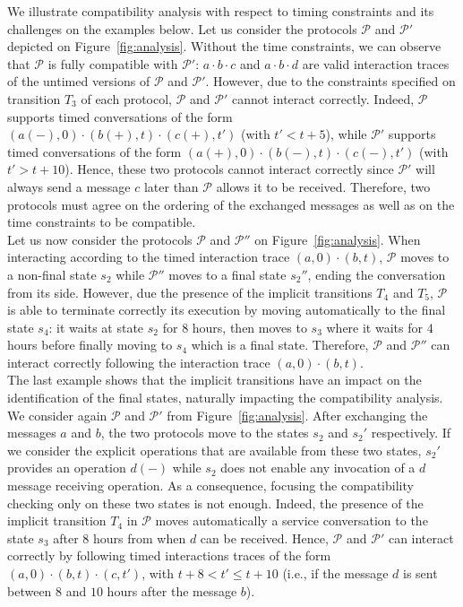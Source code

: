 We illustrate compatibility analysis with respect to timing constraints and its challenges on the examples below.
Let us consider the protocols $\mathcal{P}$ and $\mathcal{P'}$ depicted on Figure~\ref{fig:analysis}. Without the time constraints, we can observe that $\mathcal{P}$ is fully compatible with $\mathcal{P'}$: $a \cdot b \cdot c$ and
$a \cdot b \cdot d$ are valid interaction traces of the untimed versions of $\mathcal{P}$ and $\mathcal{P'}$. However, due to the \CInvoke constraints specified on transition $T_3$ of each protocol, $\mathcal{P}$ and $\mathcal{P'}$ cannot interact correctly. Indeed, $\mathcal{P}$ supports timed conversations of the form $(a(-), 0) \cdot (b(+), t) \cdot (c(+), t')$ (with $t' < t + 5$), while $\mathcal{P'}$ supports timed conversations of the form $(a(+), 0) \cdot (b(-), t) \cdot (c(-), t')$ (with $t' > t + 10$). Hence, these two protocols cannot interact correctly since $\mathcal{P'}$ will always send a message $c$ later than $\mathcal{P}$ allows it to be received. Therefore, two protocols must agree on the ordering of the exchanged messages as well as on the time constraints to be compatible.\\

Let us now consider the protocols $\mathcal{P}$ and $\mathcal{P''}$ on Figure~\ref{fig:analysis}. When interacting according to the timed interaction trace $(a, 0) \cdot (b, t)$, $\mathcal{P}$ moves to a non-final state $s_2$ while $\mathcal{P''}$ moves to a final state  $s_2''$, ending the conversation from its side. However, due the presence of the implicit transitions $T_4$ and $T_5$, $\mathcal{P}$ is able to terminate correctly its execution by moving automatically to the final state $s_4$: it waits at state $s_2$ for $8$ hours, then moves to $s_3$ where it waits for $4$ hours before finally moving to $s_4$ which is a final state. Therefore, $\mathcal{P}$ and $\mathcal{P''}$ can interact correctly following the interaction trace $(a, 0) \cdot (b, t)$.\\

The last example shows that the implicit transitions have an impact on the identification of the final states, naturally impacting the compatibility analysis. We consider again $\mathcal{P}$ and $\mathcal{P'}$ from Figure~\ref{fig:analysis}.
After exchanging the messages $a$ and $b$, the two protocols move to the states $s_2$ and $s_2'$ respectively. If we consider the explicit operations that are available from these two states, $s_2'$ provides an operation $d(-)$ while $s_2$ does not enable any invocation of a $d$ message receiving operation. As a consequence, focusing the compatibility checking only on these two states is not enough. Indeed, the presence of the implicit transition $T_4$ in $\mathcal{P}$ moves automatically a service conversation to the state $s_3$ after $8$ hours from when $d$ can be received. Hence, $\mathcal{P}$ and $\mathcal{P'}$ can interact correctly by following timed interactions traces of the form $(a, 0) \cdot (b, t) \cdot (c, t')$, with $t + 8 < t' \leq t + 10$ (i.e., if the message $d$ is sent between $8$ and $10$ hours after the message $b$).

